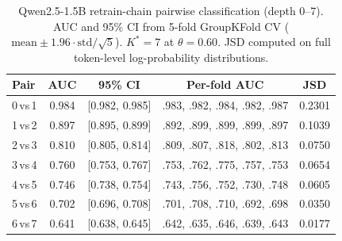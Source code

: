 \begin{table}[t]
\centering
\small
\begin{tabular}{lcccc}
\toprule
\textbf{Pair} & \textbf{AUC} & \textbf{95\% CI} & \textbf{Per-fold AUC} & \textbf{JSD} \\
\midrule
0\,vs\,1 & 0.984 & [0.982, 0.985] & .983, .982, .984, .982, .987 & 0.2301 \\
1\,vs\,2 & 0.897 & [0.895, 0.899] & .892, .899, .899, .899, .897 & 0.1039 \\
2\,vs\,3 & 0.810 & [0.805, 0.814] & .809, .807, .818, .802, .813 & 0.0750 \\
3\,vs\,4 & 0.760 & [0.753, 0.767] & .753, .762, .775, .757, .753 & 0.0654 \\
4\,vs\,5 & 0.746 & [0.738, 0.754] & .743, .756, .752, .730, .748 & 0.0605 \\
5\,vs\,6 & 0.702 & [0.696, 0.708] & .701, .708, .710, .692, .698 & 0.0350 \\
6\,vs\,7 & 0.641 & [0.638, 0.645] & .642, .635, .646, .639, .643 & 0.0177 \\
\bottomrule
\end{tabular}
\caption{Qwen2.5-1.5B retrain-chain pairwise classification (depth 0--7). AUC and 95\% CI from 5-fold GroupKFold CV ($\text{mean} \pm 1.96 \cdot \text{std} / \sqrt{5}$). $K^{*}=7$ at $\theta=0.60$. JSD computed on full token-level log-probability distributions.}
\label{tab:retrain_depth7}
\end{table}
